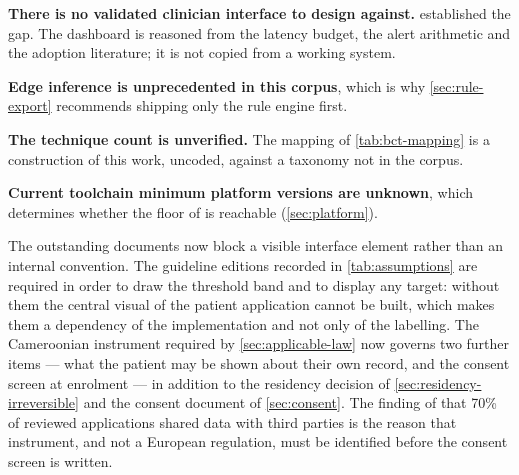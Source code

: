 \documentclass[12pt,a4paper,oneside]{report}
\begin{document}
\textbf{There is no validated clinician interface to design against.}  established the gap. The dashboard is reasoned from the latency budget, the alert arithmetic and the adoption literature; it is not copied from a working system.

\textbf{Edge inference is unprecedented in this corpus}, which is why \cref{sec:rule-export} recommends shipping only the rule engine first.

\textbf{The technique count is unverified.} The mapping of \cref{tab:bct-mapping} is a construction of this work, uncoded, against a taxonomy not in the corpus.

\textbf{Current toolchain minimum platform versions are unknown}, which determines whether the floor of \textcite{efendi2025} is reachable (\cref{sec:platform}).

The outstanding documents now block a visible interface element rather than an internal convention. The guideline editions recorded in \cref{tab:assumptions} are required in order to draw the threshold band and to display any target: without them the central visual of the patient application cannot be built, which makes them a dependency of the implementation and not only of the labelling. The Cameroonian instrument required by \cref{sec:applicable-law} now governs two further items --- what the patient may be shown about their own record, and the consent screen at enrolment --- in addition to the residency decision of \cref{sec:residency-irreversible} and the consent document of \cref{sec:consent}. The finding of \textcite{alessa2019} that 70\% of reviewed applications shared data with third parties is the reason that instrument, and not a European regulation, must be identified before the consent screen is written.

\printbibliography[heading=bibintoc,title={References}]
\end{document}
